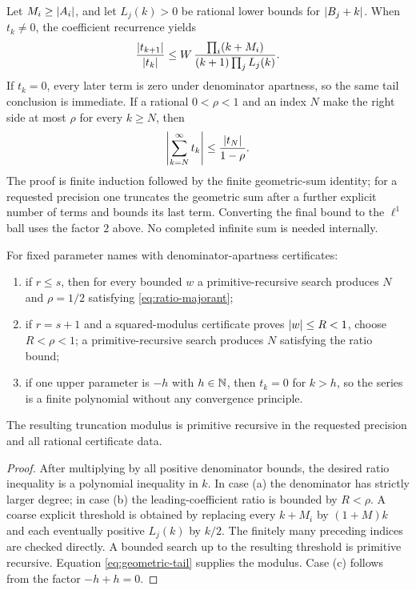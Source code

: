 Let $M_i\ge\left|A_i\right|$, and let $L_j(k)>0$ be rational lower bounds for
$\left|B_j+k\right|$.  When $t_k\ne0$, the coefficient recurrence yields
\begin{equation}\label{eq:ratio-majorant}
 \frac{\left|t_{k+1}\right|}{\left|t_k\right|}
 \le W\,
 \frac{\prod_i(k+M_i)}{(k+1)\prod_jL_j(k)}.
\end{equation}
If $t_k=0$, every later term is zero under denominator apartness, so the same
tail conclusion is immediate.  If a rational $0<\rho<1$ and an index $N$ make
the right side at most $\rho$ for every $k\ge N$, then
\begin{equation}\label{eq:geometric-tail}
 \left|\sum_{k=N}^{\infty}t_k\right|
 \le\frac{\left|t_N\right|}{1-\rho}.
\end{equation}
The proof is finite induction followed by the finite geometric-sum identity;
for a requested precision one truncates the geometric sum after a further
explicit number of terms and bounds its last term.  Converting the final bound
to the $\ell^1$ ball uses the factor $2$ above.  No completed infinite sum is
needed internally.

\begin{theorem}\label{thm:hyp-conv}
For fixed parameter names with denominator-apartness certificates:
\begin{enumerate}[label=(\alph*)]
\item if $r\le s$, then for every bounded $w$ a primitive-recursive search
      produces $N$ and $\rho=1/2$ satisfying \eqref{eq:ratio-majorant};
\item if $r=s+1$ and a squared-modulus certificate proves $\left|w\right|\le R<1$,
      choose $R<\rho<1$; a primitive-recursive search produces $N$ satisfying
      the ratio bound;
\item if one upper parameter is $-h$ with $h\in\mathbb N$, then $t_k=0$ for $k>h$,
      so the series is a finite polynomial without any convergence principle.
\end{enumerate}
The resulting truncation modulus is primitive recursive in the requested
precision and all rational certificate data.
\end{theorem}
\begin{proof}
After multiplying by all positive denominator bounds, the desired ratio
inequality is a polynomial inequality in $k$.  In case (a) the denominator has
strictly larger degree; in case (b) the leading-coefficient ratio is bounded by
$R<\rho$.  A coarse explicit threshold is obtained by replacing every
$k+M_i$ by $(1+M)k$ and each eventually positive $L_j(k)$ by $k/2$.
The finitely many preceding indices are checked directly.  A bounded search up
to the resulting threshold is primitive recursive.  Equation
\eqref{eq:geometric-tail} supplies the modulus.  Case (c) follows from the
factor $-h+h=0$.
\end{proof}

